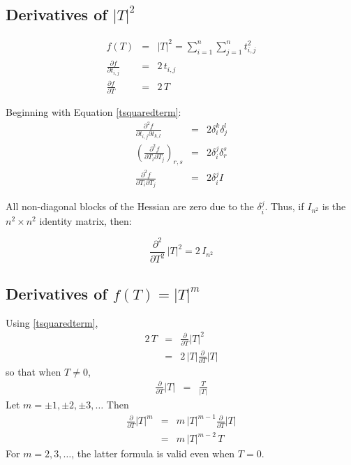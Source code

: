 \documentclass{report}
\begin{document}
\subsection{Derivatives of $|T|^2$ \label{tsquared}}

\begin{eqnarray}
f(T) &=& |T|^2 = \sum_{i=1}^n \sum_{j=1}^n t_{i,j}^2 \\
\label{tsquaredterm}
\frac{\partial f}{\partial t_{i,j}} &=& 2 \, t_{i,j} \\
\frac{\partial f}{\partial T} &=& 2 \, T
\end{eqnarray}

\noindent Beginning with Equation \ref{tsquaredterm}:
\begin{eqnarray}
\frac{\partial^2 f}{\partial t_{i,j} \partial t_{k,l}} &=& 2 \delta_i^k \delta_j^l \\
\left(\frac{\partial^2 f}{\partial T_i \partial T_j}\right)_{r,s} &=& 2 \delta_i^j \delta_r^s \\
\frac{\partial^2 f}{\partial T_i \partial T_j} &=& 2 \delta_i^j I
\end{eqnarray}

\noindent All non-diagonal blocks of the Hessian are zero due to the $\delta_i^j$.  Thus, if $I_{n^2}$ is the $n^2 \times n^2$ identity matrix, then:

\begin{equation}
\frac{\partial^2}{\partial T^2} \, |T|^2 = 2 \, I_{n^2}
\end{equation}

\subsection{Derivatives of $f(T)=|T|^m$}
Using \ref{tsquaredterm},
\begin{eqnarray}
2 \, T & = & \frac{\partial}{\partial T} |T|^2 \nonumber \\
 & = & 2 \, |T| \frac{\partial}{\partial T} |T| \nonumber
\end{eqnarray}
so that when $T \neq 0$,
\begin{eqnarray}
\frac{\partial}{\partial T} |T| & = & \frac{T}{|T|}
\end{eqnarray}
Let $m=\pm 1, \pm 2,\pm 3,\ldots$  Then
\begin{eqnarray}
\frac{\partial}{\partial T} |T|^m & = & m \, |T|^{m-1} \frac{\partial }{\partial T}|T| \\
 & = & m \, |T|^{m-2} \, T \label{firstdervoftm}
\end{eqnarray}
For $m=2,3,\ldots$, the latter formula is valid even when $T=0$. \newline
\end{document}
